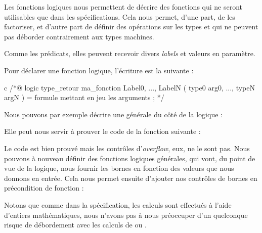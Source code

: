 Les fonctions logiques nous permettent de décrire des fonctions qui ne seront 
utilisables que dans les spécifications. Cela nous permet, d'une part, de les 
factoriser, et d'autre part de définir des opérations sur les types  et 
 qui ne peuvent pas déborder contrairement aux types machines.



Comme les prédicats, elles peuvent recevoir divers \textit{labels} et valeurs en 
paramètre.





Pour déclarer une fonction logique, l'écriture est la suivante :



\begin{CodeBlock}{c}
/*@
  logic type_retour ma_fonction{ Label0, ..., LabelN }( type0 arg0, ..., typeN argN ) =
    formule mettant en jeu les arguments ;
*/
\end{CodeBlock}



Nous pouvons par exemple décrire une  générale du côté de la logique :






Elle peut nous servir à prouver le code de la fonction suivante :








Le code est bien prouvé mais les contrôles d'\textit{overflow}, eux, ne le sont pas. Nous 
pouvons à nouveau définir des fonctions logiques générales, qui vont, du point de 
vue de la logique, nous fournir les bornes en fonction des valeurs que nous donnons
en entrée. Cela nous permet ensuite d'ajouter nos contrôles de bornes en 
précondition de fonction :






\begin{Information}
Notons que comme dans la spécification, les calculs sont effectués à l'aide 
d'entiers mathématiques, nous n'avons pas à nous préoccuper d'un quelconque
risque de débordement avec les calculs de  ou .
\end{Information}


